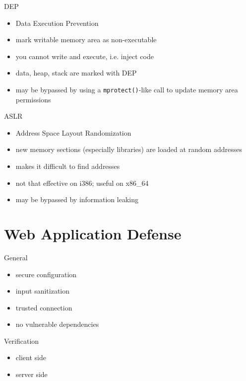 \documentclass{curs}
\begin{document}
\begin{frame}{DEP}
  \begin{itemize}
    \item Data Execution Prevention
    \item mark writable memory area as non-executable
    \item you cannot write and execute, i.e. inject code
    \item data, heap, stack are marked with DEP
    \item may be bypassed by using a \texttt{mprotect()}-like call to update memory area permissions
  \end{itemize}
\end{frame}

\begin{frame}{ASLR}
  \begin{itemize}
    \item Address Space Layout Randomization
    \item new memory sections (especially libraries) are loaded at random addresses
    \item makes it difficult to find addresses
    \item not that effective on i386; useful on x86\_64
    \item may be bypassed by information leaking
  \end{itemize}
\end{frame}

\section{Web Application Defense}

\begin{frame}{General}
  \begin{itemize}
    \item secure configuration
    \item input sanitization
    \item trusted connection
    \item no vulnerable dependencies
  \end{itemize}
\end{frame}

\begin{frame}{Verification}
  \begin{itemize}
    \item client side
    \item server side
  \end{itemize}
\end{frame}
\end{document}

